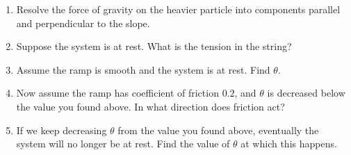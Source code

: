 \documentclass{article}
\begin{document}
\begin{center}
\end{center}

\begin{enumerate}
	\item Resolve the force of gravity on the heavier particle into components parallel and perpendicular to the slope.
	\item Suppose the system is at rest. What is the tension in the string?
	\item Assume the ramp is smooth and the system is at rest. Find $\theta$.
	\item Now assume the ramp has coefficient of friction $0.2$, and $\theta$ is decreased below the value you found above. In what direction does friction act?
	\item If we keep decreasing $\theta$ from the value you found above, eventually the system will no longer be at rest. Find the value of $\theta$ at which this happens.
\end{enumerate}
\end{document}
